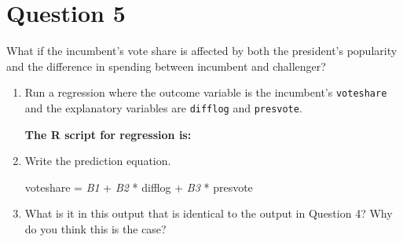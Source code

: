 \documentclass[12pt,letterpaper]{article}
\begin{document}
	\newpage	

\section*{Question 5}
\noindent What if the incumbent's vote share is affected by both the president's popularity and the difference in spending between incumbent and challenger? 
	\begin{enumerate}
		\item Run a regression where the outcome variable is the incumbent's \texttt{voteshare} and the explanatory variables are \texttt{difflog} and \texttt{presvote}.
	
	
		\textbf{		The R script for regression is:}
		 
	
	
	
		\item Write the prediction equation.
	
	
		voteshare = \textit{B1} + \textit{B2} * difflog + \textit{B3} * presvote
	
		\item What is it in this output that is identical to the output in Question 4? Why do you think this is the case?
	
	
	
	\end{enumerate}
\end{document}

